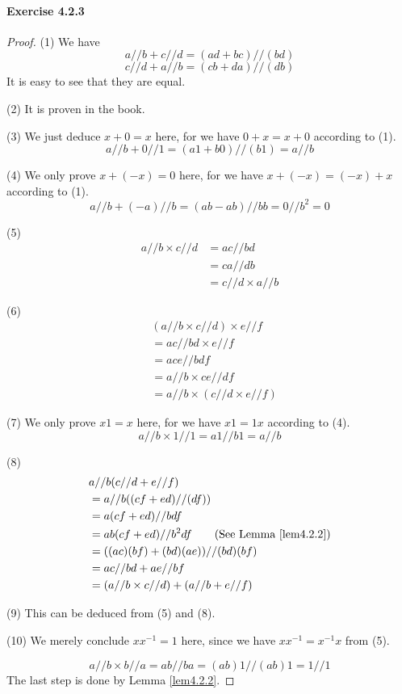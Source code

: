 \paragraph{Exercise 4.2.3} \label{exercise4.2.3}
\begin{proof}
(1)
We have
\[
a//b + c//d = (ad+bc)//(bd)
\]
\[
c//d + a//b = (cb+da)//(db)
\]
It is easy to see that they are equal.

(2)
It is proven in the book.

(3)
We just deduce $x+0=x$ here, for we have $0+x=x+0$ according to (1).
\[
a//b + 0//1 = (a1+b0)//(b1) = a//b
\]

(4)
We only prove $x+(-x)=0$ here, for we have $x+(-x)=(-x)+x$ according to (1).
\[
a//b+(-a)//b= (ab-ab)//bb = 0//b^2=0
\]

(5)
\begin{align*}
a//b \times c//d
&= ac//bd \\
&= ca//db \\
&= c//d \times a//b
\end{align*}

(6)
\begin{align*}
&(a//b \times c//d) \times e//f \\
&= ac//bd \times e//f \\
&= ace//bdf \\
&= a//b \times ce//df \\
&= a//b \times (c//d \times e//f)
\end{align*}

(7)
We only prove $x1=x$ here, for we have $x1=1x$ according to (4).
\[
a//b \times 1//1 = a1//b1 = a//b
\]

(8)
\begin{align*}
&a//b (c//d + e//f) \\
&= a//b ((cf+ed) // (df)) \\
&= a(cf+ed)//bdf \\
&= ab(cf+ed) // b^2df \tag{See Lemma \ref{lem4.2.2}} \\
&= ((ac)(bf) + (bd)(ae)) // (bd)(bf) \\
&= ac//bd + ae//bf \\
&= (a//b \times c//d) + (a//b + e//f)
\end{align*}

(9)
This can be deduced from (5) and (8).

(10)
We merely conclude $xx^{-1} = 1$ here, since we have $xx^{-1} = x^{-1}x$ from (5).

\[
a//b \times b//a  = ab//ba = (ab)1//(ab)1 = 1//1
\]
The last step is done by Lemma \ref{lem4.2.2}.
\end{proof}

